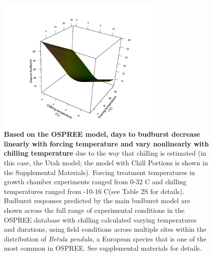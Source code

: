 \documentclass{article}
\begin{document}
\newpage
\begin{figure}[h!]
\centering
\noindent \includegraphics[width=0.75\textwidth]{..//..//analyses/bb_analysis/figures/bbmod_3dplot_utah_withPEP.png}
\caption{\textbf{Based on the OSPREE model, days to budburst decrease linearly with forcing temperature and vary nonlinearly with chilling temperature} due to the way that chilling is estimated (in this case, the Utah model; the model with Chill Portions is shown in the Supplemental Materials). Forcing treatment temperatures in growth chamber experiments ranged from 0-32 \degree C and chilling temperatures ranged from -10-16 \degree C(see Table 2S for details). Budburst responses predicted by the main budburst model are shown across the full range of experimental conditions in the OSPREE database with chilling calculated varying temperatures and durations, using field conditions across multiple sites within the distribution of \emph{Betula pendula}, a European species that is one of the most common in OSPREE. See supplemental materials for details.}
\label{fig:apc}
\end{figure}
\newpage
\end{document}
